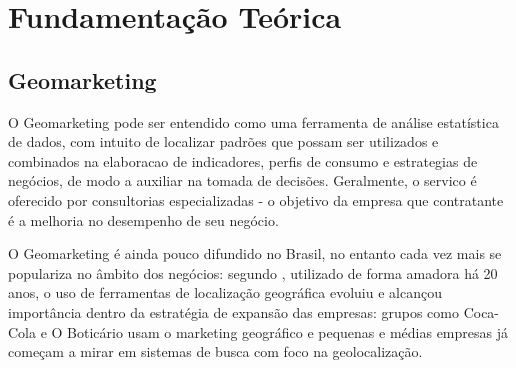 
\chapter{Fundamentação Teórica}
\label{fundamentacao-teorica}

\section {Geomarketing}
O Geomarketing pode ser entendido como uma ferramenta de análise estatística de dados, com intuito de localizar padrões que possam ser utilizados e combinados na elaboracao de indicadores, perfis de consumo e estrategias de negócios, de modo a auxiliar na tomada de decisões. Geralmente, o servico é oferecido por consultorias especializadas - o  objetivo da empresa que contratante é a melhoria no desempenho de seu negócio.

O Geomarketing é ainda pouco difundido no Brasil, no entanto cada vez mais se populariza no âmbito dos negócios: segundo \cite{Exame}, utilizado de forma amadora há 20 anos, o uso de ferramentas de localização geográfica evoluiu e alcançou importância dentro da estratégia de expansão das empresas: grupos como Coca-Cola e O Boticário usam o marketing geográfico e pequenas e médias empresas já começam a mirar em sistemas de busca com foco na geolocalização. 